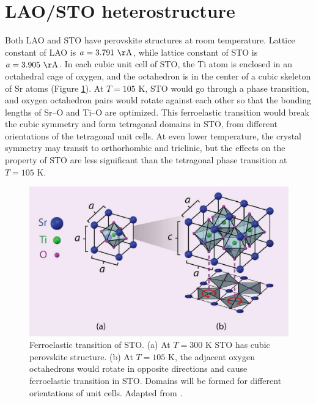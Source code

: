 \documentclass[pdflatex, sectionletters, 12pt]{pittetd}    %
\begin{document}
\section{LAO/STO heterostructure}

Both LAO and STO have perovskite structures at room temperature. Lattice constant of LAO is $a = 3.791 \ \mathrm{\AA}$\cite{geller1956crystallographic}, while lattice constant of STO is $a = 3.905 \ \mathrm{\AA}$. In each cubic unit cell of STO, the Ti atom is enclosed in an octahedral cage of oxygen, and the octahedron is in the center of a cubic skeleton of Sr atoms (Figure \ref{FIG:STOPhaseTransition}). At $T=105$ K, STO would go through a phase transition, and oxygen octahedron pairs would rotate against each other so that the bonding lengths of Sr--O and Ti--O are optimized\cite{sulpizio2014nanoscale}. This ferroelastic transition would break the cubic symmetry and form tetragonal domains in STO, from different orientations of the tetragonal unit cells. At even lower temperature, the crystal symmetry may transit to orthorhombic and triclinic, but the effects on the property of STO are less significant than the tetragonal phase transition at $T=105$ K.
\\

\begin{figure}[h!]
	\centering
	\includegraphics[width=.80\textwidth]{Drawing/STOPhaseTransition.pdf}
	\caption{Ferroelastic transition of STO. (a) At $T=300$ K STO has cubic perovskite structure. (b) At $T = 105$ K, the adjacent oxygen octahedrons would rotate in opposite directions and cause ferroelastic transition in STO. Domains will be formed for different orientations of unit cells. Adapted from \cite{sulpizio2014nanoscale}.}
	\label{FIG:STOPhaseTransition}
\end{figure}
\end{document}
